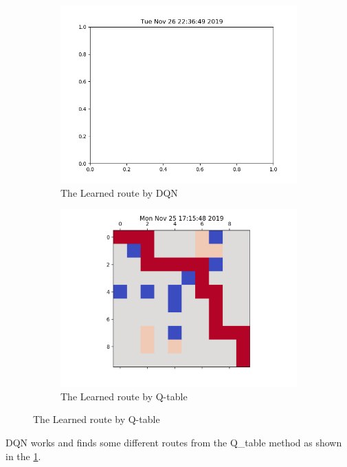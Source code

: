 \documentclass[a4paper]{article}
\begin{document}
\begin{enumerate}
  \begin{figure}
    \begin{subfigure}[H]{0.5\textwidth}
      \includegraphics[width=\textwidth]{../10_10_dqn.png}
      \caption{The Learned route by DQN}
      \label{fig:2}
    \end{subfigure}
    \begin{subfigure}[H]{0.5\textwidth}
      \includegraphics[width=\textwidth]{../10_10_q_table.png}
      \caption{The Learned route by Q-table}
      \label{fig:3}
    \end{subfigure}
  \end{figure}
  DQN works and finds some different routes from the Q\_table method as shown in the \ref{fig:2}.

\end{enumerate}
\end{document}
